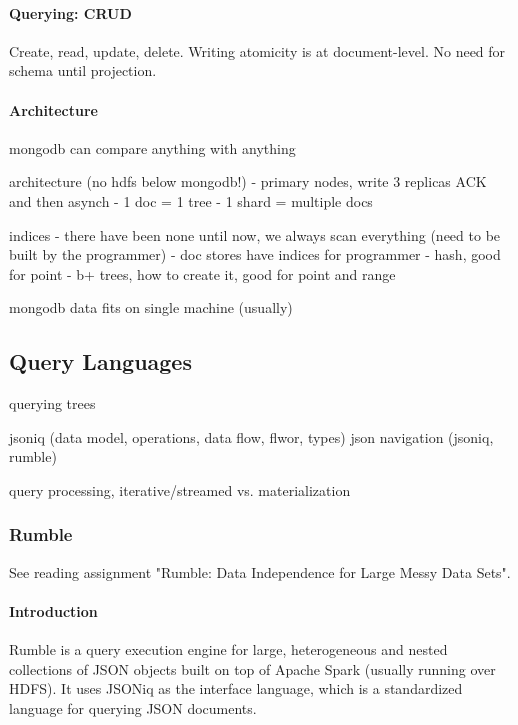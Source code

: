 \paragraph{Querying: CRUD}
Create, read, update, delete. Writing atomicity is at document-level. No need for schema until projection. %

\paragraph{Architecture}






mongodb can compare anything with anything

architecture (no hdfs below mongodb!)
- primary nodes, write 3 replicas ACK and then asynch
- 1 doc = 1 tree
- 1 shard = multiple docs


indices
- there have been none until now, we always scan everything (need to be built by the programmer)
- doc stores have indices for programmer
- hash, good for point
- b+ trees, how to create it, good for point and range


mongodb data fits on single machine (usually)




\subsection{Query Languages}




querying trees

jsoniq (data model, operations, data flow, flwor, types)
json navigation (jsoniq, rumble)

query processing, iterative/streamed vs. materialization





\subsubsection{Rumble}

See reading assignment "Rumble: Data Independence for Large Messy Data Sets".

\paragraph{Introduction}
Rumble is a query execution engine for large, heterogeneous and nested collections of JSON objects built on top of Apache Spark (usually running over HDFS). It uses JSONiq as the interface language, which is a standardized language for querying JSON documents.

